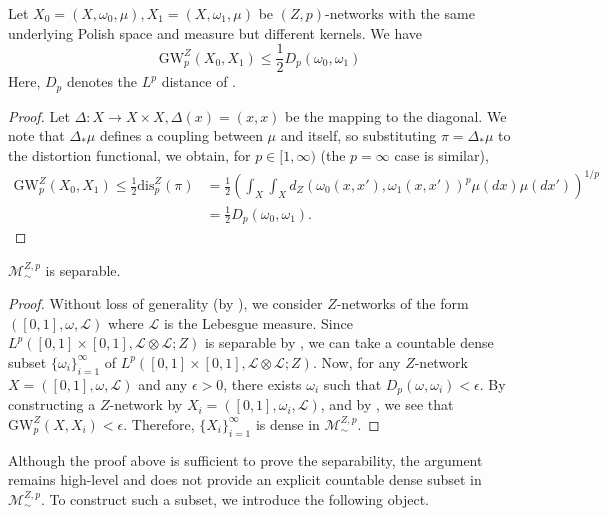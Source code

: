 \documentclass[twoside,11pt]{article}
\theoremstyle{definition}
\newcommand{\M}{\mathcal{M}}
\newcommand{\MZp}{\M_{\sim}^{Z,p}}
\newcommand{\dgwz}{\mathrm{GW}_p^Z}
\newcommand{\disp}{\mathrm{dis}_p}
\begin{document}
\begin{lemma}
    \label{lem: lp comparison} Let $X_0=(X,\omega_0, \mu), X_1=(X,\omega_1,\mu)$ be $(Z,p)$-networks with the same underlying Polish space and measure but different kernels. We have 
    \begin{equation}
        \dgwz(X_0, X_1) \leq \frac{1}{2} D_p(\omega_0, \omega_1)
    \end{equation}
    Here, $D_p$ denotes the $L^p$ distance of .
\end{lemma}
\begin{proof}\belowdisplayskip=-12pt
    Let $\Delta: X\to X\times X, \Delta(x)=(x,x)$ be the mapping to the diagonal. We note that $\Delta_*\mu$ defines a coupling between $\mu$ and itself, so substituting $\pi=\Delta_*\mu$ to the distortion functional, we obtain, for $p\in [1,\infty)$ (the $p = \infty$ case is similar),
    \begin{align}
        \dgwz(X_0,X_1) \leq \frac{1}{2} \disp^Z(\pi)&=\frac{1}{2}\left(\int_{X}\int_{X}d_Z(\omega_0(x,x'),\omega_1(x,x'))^p\mu(dx)\mu(dx')\right)^{1/p} \\ &= \frac{1}{2}D_p(\omega_0,\omega_1).
    \end{align}
\end{proof}

\begin{proposition}
    \label{prop: separability}
    $\MZp$ is separable.
\end{proposition}
\begin{proof}
     Without loss of generality (by ), we consider $Z$-networks of the form $([0,1],\omega, \mathscr{L})$ where $\mathscr{L}$ is the Lebesgue measure. Since $L^p([0,1]\times [0,1], \mathscr{L}\otimes \mathscr{L};Z)$ is separable by , we can take a countable dense subset $\{\omega_i\}_{i=1}^\infty$ of $L^p([0,1]\times [0,1], \mathscr{L}\otimes \mathscr{L};Z)$. Now, for any $Z$-network $X=([0,1], \omega, \mathscr{L})$ and any $\epsilon>0$, there exists $\omega_i$ such that $D_p(\omega, \omega_i) < \epsilon$. By constructing a $Z$-network by $X_i=([0,1], \omega_i, \mathscr{L})$, and by , we see that $\dgwz(X,X_i)<\epsilon$. Therefore, $\{X_i\}_{i=1}^{\infty}$ is dense in $\MZp$.
\end{proof}
Although the proof above is sufficient to prove the separability, the argument remains high-level and does not provide an explicit countable dense subset in $\MZp$. To construct such a subset, we introduce the following object.
\end{document}
